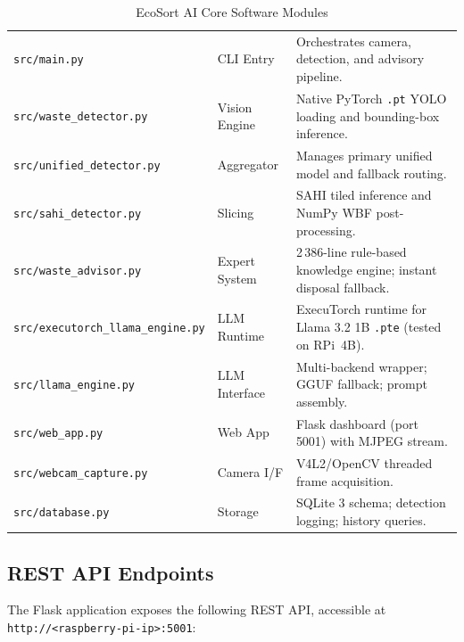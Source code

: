 \documentclass[12pt,a4paper]{article}
\begin{document}
\renewcommand{\arraystretch}{1.30}
\begin{table}[H]
\centering
\caption{EcoSort AI Core Software Modules}
\label{tab:modules}
\small
\begin{tabularx}{\linewidth}{@{} L{5.6cm} L{2.4cm} X @{}}
\toprule
{} &  &  \\
\midrule
{}
{\footnotesize\texttt{src/main.py}}                    & CLI Entry     & Orchestrates camera, detection, and advisory pipeline. \\
{\footnotesize\texttt{src/waste\_detector.py}}         & Vision Engine & Native PyTorch \texttt{.pt} YOLO loading and bounding-box inference. \\
{\footnotesize\texttt{src/unified\_detector.py}}       & Aggregator    & Manages primary unified model and fallback routing. \\
{\footnotesize\texttt{src/sahi\_detector.py}}          & Slicing       & SAHI tiled inference and NumPy WBF post-processing. \\
{\footnotesize\texttt{src/waste\_advisor.py}}          & Expert System & 2\,386-line rule-based knowledge engine; instant disposal fallback. \\
{\footnotesize\texttt{src/executorch\_llama\_engine.py}} & LLM Runtime & ExecuTorch runtime for Llama 3.2 1B \texttt{.pte} (tested on RPi~4B). \\
{\footnotesize\texttt{src/llama\_engine.py}}           & LLM Interface & Multi-backend wrapper; GGUF fallback; prompt assembly. \\
{\footnotesize\texttt{src/web\_app.py}}                & Web App       & Flask dashboard (port 5001) with MJPEG stream. \\
{\footnotesize\texttt{src/webcam\_capture.py}}         & Camera I/F    & V4L2/OpenCV threaded frame acquisition. \\
{\footnotesize\texttt{src/database.py}}                & Storage       & SQLite 3 schema; detection logging; history queries. \\
\bottomrule
\end{tabularx}
\end{table}

\subsection{REST API Endpoints}

The Flask application exposes the following REST API, accessible at
\texttt{http://\textless{}raspberry-pi-ip\textgreater{}:5001}:
\end{document}
